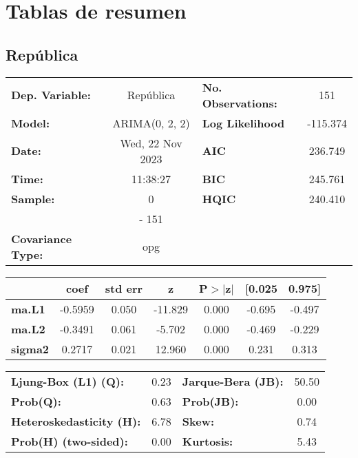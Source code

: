 \documentclass{article}%
\begin{document}
%
\section{Tablas de resumen}%
\label{sec:Tablasderesumen}%
\subsection*{República}%
\begin{center}
\begin{tabular}{lclc}
\toprule
\textbf{Dep. Variable:}          &    República     & \textbf{  No. Observations:  } &    151      \\
\textbf{Model:}                  &  ARIMA(0, 2, 2)  & \textbf{  Log Likelihood     } &  -115.374   \\
\textbf{Date:}                   & Wed, 22 Nov 2023 & \textbf{  AIC                } &  236.749    \\
\textbf{Time:}                   &     11:38:27     & \textbf{  BIC                } &  245.761    \\
\textbf{Sample:}                 &        0         & \textbf{  HQIC               } &  240.410    \\
\textbf{}                        &       - 151      & \textbf{                     } &             \\
\textbf{Covariance Type:}        &       opg        & \textbf{                     } &             \\
\bottomrule
\end{tabular}
\begin{tabular}{lcccccc}
                & \textbf{coef} & \textbf{std err} & \textbf{z} & \textbf{P$> |$z$|$} & \textbf{[0.025} & \textbf{0.975]}  \\
\midrule
\textbf{ma.L1}  &      -0.5959  &        0.050     &   -11.829  &         0.000        &       -0.695    &       -0.497     \\
\textbf{ma.L2}  &      -0.3491  &        0.061     &    -5.702  &         0.000        &       -0.469    &       -0.229     \\
\textbf{sigma2} &       0.2717  &        0.021     &    12.960  &         0.000        &        0.231    &        0.313     \\
\bottomrule
\end{tabular}
\begin{tabular}{lclc}
\textbf{Ljung-Box (L1) (Q):}     & 0.23 & \textbf{  Jarque-Bera (JB):  } & 50.50  \\
\textbf{Prob(Q):}                & 0.63 & \textbf{  Prob(JB):          } &  0.00  \\
\textbf{Heteroskedasticity (H):} & 6.78 & \textbf{  Skew:              } &  0.74  \\
\textbf{Prob(H) (two-sided):}    & 0.00 & \textbf{  Kurtosis:          } &  5.43  \\
\bottomrule
\end{tabular}
\end{center}
\end{document}
